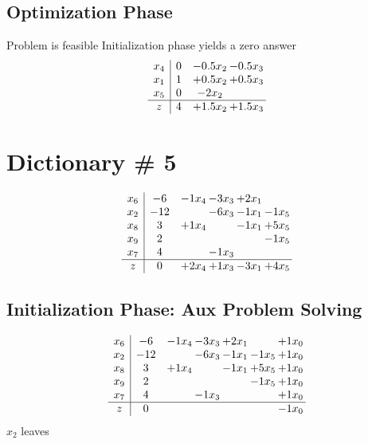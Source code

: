 \documentclass[12pt]{article}
\begin{document}
\subsection{Optimization Phase}

Problem is feasible Initialization phase yields a zero answer 
\[\begin{array}{c| c c@{\hskip 2pt} c@{\hskip 2pt} }
 x_{4}   &  0 & -0.5 x_{2} & -0.5 x_{3}\\
 x_{1}   &  1 & + 0.5 x_{2} & + 0.5 x_{3}\\
 x_{5}   &  0 & -2 x_{2} &   \\
\hline
z    &  4 & + 1.5 x_{2} & + 1.5 x_{3}\\
\end{array}\]

\section{Dictionary \# 5}

\[\begin{array}{c| c c@{\hskip 2pt} c@{\hskip 2pt} c@{\hskip 2pt} c@{\hskip 2pt} }
 x_{6}   &  -6 & -1 x_{4} & -3 x_{3} & + 2 x_{1} &   \\
 x_{2}   &  -12  &   & -6 x_{3} & -1 x_{1} & -1 x_{5}\\
 x_{8}   &  3 & + 1 x_{4} &   & -1 x_{1} & + 5 x_{5}\\
 x_{9}   &  2  &    &    &   & -1 x_{5}\\
 x_{7}   &  4  &   & -1 x_{3} &    &   \\
\hline
z    &  0 & + 2 x_{4} & + 1 x_{3} & -3 x_{1} & + 4 x_{5}\\
\end{array}\]
\subsection{Initialization Phase: Aux Problem Solving}
\[\begin{array}{c| c c@{\hskip 2pt} c@{\hskip 2pt} c@{\hskip 2pt} c@{\hskip 2pt} c@{\hskip 2pt} }
 x_{6}   &  -6 & -1 x_{4} & -3 x_{3} & + 2 x_{1} &   & + 1 x_{0}\\
 x_{2}   &  -12  &   & -6 x_{3} & -1 x_{1} & -1 x_{5} & + 1 x_{0}\\
 x_{8}   &  3 & + 1 x_{4} &   & -1 x_{1} & + 5 x_{5} & + 1 x_{0}\\
 x_{9}   &  2  &    &    &   & -1 x_{5} & + 1 x_{0}\\
 x_{7}   &  4  &   & -1 x_{3} &    &   & + 1 x_{0}\\
\hline
z    &  0  &    &    &    &   & -1 x_{0}\\
\end{array}\]
$ x_{2} $ leaves 
\end{document}
